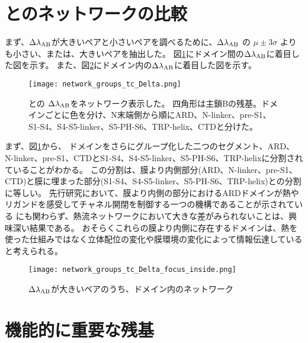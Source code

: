 \section{\openFortyTwo と\closeFortyTwo のネットワークの比較}
\label{sec:network_comparison}

まず、$\Delta \lambda_{\rm{AB}}$が大きいペアと小さいペアを調べるために、$\Delta \lambda_{\rm{AB}}$ の $\mu \pm 3 \sigma$ よりも小さい、または、大きいペアを抽出した。
図\ref{fig:network_groups_tc_Delta}にドメイン間の$\Delta \lambda_{\rm{AB}}$に着目した図を示す。
また、図\ref{fig:network_groups_tc_Delta_focus_inside}にドメイン内の$\Delta \lambda_{\rm{AB}}$に着目した図を示す。

\begin{figure}
  \centering
  \texttt{[image: network\_groups\_tc\_Delta.png]}
  \caption{\openFortyTwo と\closeFortyTwo の $\Delta \lambda_{\rm{AB}}$をネットワーク表示した。
            四角形は主鎖Bの残基。ドメインごとに色を分け、N末端側から順にARD、N-linker、pre-S1、S1-S4、S4-S5-linker、S5-PH-S6、TRP-helix、CTDと分けた。
            \autocite{pumroy_structural_2020}}
  \label{fig:network_groups_tc_Delta}
\end{figure}

まず、図\ref{fig:network_groups_tc_Delta}から、
ドメインをさらにグループ化した二つのセグメント、ARD、N-linker、pre-S1、CTDとS1-S4、S4-S5-linker、S5-PH-S6、TRP-helixに分割されていることがわかる。
この分割は、膜より内側部分(ARD、N-linker、pre-S1、CTD)と膜に埋まった部分(S1-S4、S4-S5-linker、S5-PH-S6、TRP-helix)との分割に等しい。
先行研究において、膜より内側の部分におけるARDドメインが熱やリガンドを感受してチャネル開閉を制御する一つの機構であることが示されている\autocite{phelps_differential_2010,phelps_insights_2007,shi_crystal_2013}
にも関わらず、熱流ネットワークにおいて大きな差がみられないことは、興味深い結果である。
おそらくこれらの膜より内側に存在するドメインは、熱を使った仕組みではなく立体配位の変化や膜環境の変化によって情報伝達していると考えられる。

\begin{figure}
  \centering
  \texttt{[image: network\_groups\_tc\_Delta\_focus\_inside.png]}
  \caption{$\Delta \lambda_{\rm{AB}}$が大きいペアのうち、ドメイン内のネットワーク}
  \label{fig:network_groups_tc_Delta_focus_inside}
\end{figure}

\section{機能的に重要な残基}

